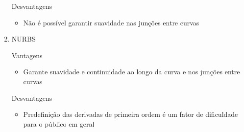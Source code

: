 \begin{enumerate}
		Desvantagens
		
		\begin{itemize}
			\item Não é possível garantir suavidade nas junções entre curvas
		\end{itemize}	
		
		\item NURBS
	
		Vantagens
		\begin{itemize}
			\item Garante suavidade e continuidade ao longo da curva
			e nos junções entre curvas
		\end{itemize}				
		
		Desvantagens
		
		\begin{itemize}
			\item Predefinição das derivadas de primeira
			ordem é um fator de dificuldade para o 
			público em geral
		\end{itemize}	
		
	\end{enumerate}